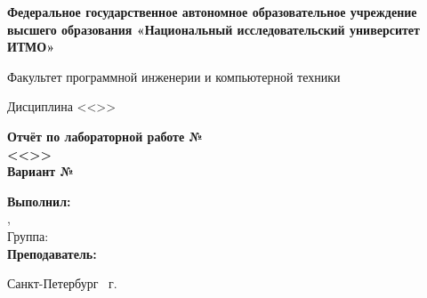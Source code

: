 \thispagestyle{empty}
\begin{titlepage}
	\clearpage\thispagestyle{empty}
	\centering
	
	\textbf{Федеральное государственное автономное образовательное учреждение высшего образования «Национальный исследовательский университет ИТМО»}

\vspace{15mm}
Факультет программной инженерии и компьютерной техники

Дисциплина <<\LabSubject>>

\vspace{40mm}
{\bfseries \Large Отчёт по лабораторной работе №\LabNumber\\<<\LabName>>\\Вариант №\LabVariant}

\vspace{10mm}
	\begin{flushright}
		\noindent
		\textbf{Выполнил:}\\\StudentName,\\
		Группа: \Group\\

		\vspace{1cm}
		\textbf{Преподаватель:}\\\TeacherName
	\end{flushright}
	
	\vfill
	Санкт-Петербург \Year\ г.
	\pagebreak
\end{titlepage}
